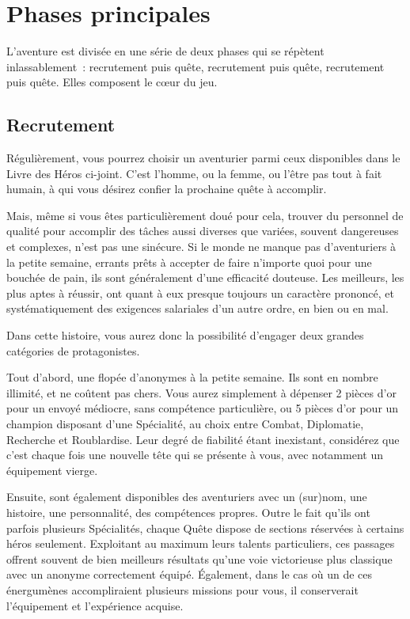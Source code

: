 \documentclass{report}
\begin{document}
\section{Phases principales}

L'aventure est divisée en une série de deux phases qui se répètent inlassablement : recrutement puis quête, recrutement puis quête, recrutement puis quête. Elles composent le cœur du jeu.

\subsection{Recrutement}

Régulièrement, vous pourrez choisir un aventurier parmi ceux disponibles dans le Livre des Héros ci-joint. C'est l'homme, ou la femme, ou l'être pas tout à fait humain, à qui vous désirez confier la prochaine quête à accomplir.

Mais, même si vous êtes particulièrement doué pour cela, trouver du personnel de qualité pour accomplir des tâches aussi diverses que variées, souvent dangereuses et complexes, n'est pas une sinécure. Si le monde ne manque pas d'aventuriers à la petite semaine, errants prêts à accepter de faire n'importe quoi pour une bouchée de pain, ils sont généralement d'une efficacité douteuse. Les meilleurs, les plus aptes à réussir, ont quant à eux presque toujours un caractère prononcé, et systématiquement des exigences salariales d'un autre ordre, en bien ou en mal.

Dans cette histoire, vous aurez donc la possibilité d'engager deux grandes catégories de protagonistes.

Tout d'abord, une flopée d'anonymes à la petite semaine. Ils sont en nombre illimité, et ne coûtent pas chers. Vous aurez simplement à dépenser 2 pièces d'or pour un envoyé médiocre, sans compétence particulière, ou 5 pièces d'or pour un champion disposant d'une Spécialité, au choix entre Combat, Diplomatie, Recherche et Roublardise. Leur degré de fiabilité étant inexistant, considérez que c'est chaque fois une nouvelle tête qui se présente à vous, avec notamment un équipement vierge.

Ensuite, sont également disponibles des aventuriers avec un (sur)nom, une histoire, une personnalité, des compétences propres. Outre le fait qu'ils ont parfois plusieurs Spécialités, chaque Quête dispose de sections réservées à certains héros seulement. Exploitant au maximum leurs talents particuliers, ces passages offrent souvent de bien meilleurs résultats qu'une voie victorieuse plus classique avec un anonyme correctement équipé. Également, dans le cas où un de ces énergumènes accompliraient plusieurs missions pour vous, il conserverait l'équipement et l'expérience acquise.
\end{document}
